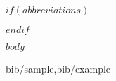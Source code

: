 \documentclass[12pt,final,CPage]{ufthesis} %
\begin{document}

$if(abbreviations)$
	\dedication{$abbreviations$}
$endif$







	$body$

%









 {bib/sample,bib/example}



\end{document}
